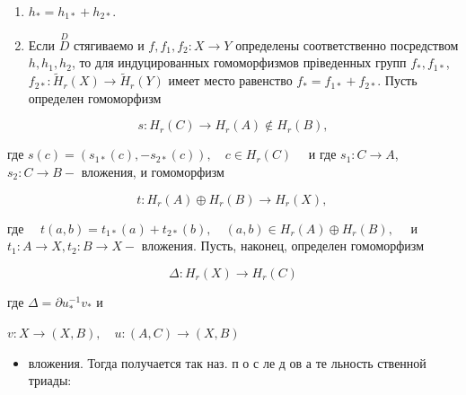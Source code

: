 \documentclass[10pt]{article}
\begin{document}
\begin{enumerate}

  \item $h_{*}=h_{1 *}+h_{2 *}$.



  \item Если $\stackrel{D}{D}$ стягиваемо и $f, f_{1}, f_{2}: X \rightarrow Y$ определены соответственно посредством $h, h_{1}, h_{2}$, то для индуцированных гомоморфизмов пріведенных групп $f_{*}, f_{1 *}$, $f_{2 *}: \widetilde{H}_{r}(X) \rightarrow \tilde{H}_{r}(Y)$ имеет место равенство $f_{*}=f_{1 *}+f_{2 *}$. Пусть определен гомоморфизм



\end{enumerate}



\[

s: H_{r}(C) \longrightarrow H_{r}(A) \notin H_{r}(B),

\]



где $s(c)=\left(s_{1 *}(c),-s_{2 *}(c)\right), \quad c \in H_{r}(C) \quad$ и где $s_{1}: C \rightarrow A$, $s_{2}: C \rightarrow B-$ вложения, и гомоморфизм



\[

t: H_{r}(A) \oplus H_{r}(B) \longrightarrow H_{r}(X) \text {, }

\]



где $\quad t(a, b)=t_{1 *}(a)+t_{2 *}(b), \quad(a, b) \in H_{r}(A) \oplus H_{r}(B), \quad$ и $t_{1}: A \rightarrow X, t_{2}: B \rightarrow X-$ вложения. Пусть, наконец, определен гомоморфизм



\[

\Delta: H_{r}(X) \longrightarrow H_{r}(C)

\]



где $\Delta=\partial u_{*}^{-1} v_{*}$ и



$v: X \longrightarrow(X, B), \quad u:(A, C) \longrightarrow(X, B)$



\begin{itemize}

  \item вложения. Тогда получается так наз. п о с ле д ов а те льность ственной триады:

\end{itemize}
\end{document}
